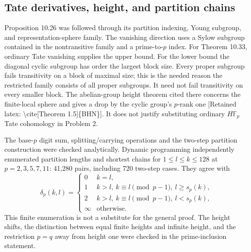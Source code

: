 \documentclass[10pt]{article}
\begin{document}
\subsection*{Tate derivatives, height, and partition chains}
Proposition 10.26 was followed through its partition indexing, Young subgroup, and representation-sphere family. The vanishing direction uses a Sylow subgroup contained in the nontransitive family and a prime-to-\(p\) index. For Theorem 10.33, ordinary Tate vanishing supplies the upper bound. For the lower bound the diagonal cyclic subgroup has order the largest block size. Every proper subgroup fails transitivity on a block of maximal size; this is the needed reason the restricted family consists of all proper subgroups. It need not fail transitivity on every smaller block. The abelian-group height theorem cited there concerns the finite-local sphere and gives a drop by the cyclic group’s \(p\)-rank one [Retained latex: \textbackslash{}cite[Theorem 1.5]\{BHN\}]. It does not justify substituting ordinary \(H\mathbb F_p\) Tate cohomology in Problem 2.\par
The base-\(p\) digit sum, splitting/carrying operations and the two-step partition construction were checked analytically. Dynamic programming independently enumerated partition lengths and shortest chains for \(1\le l\le k\le128\) at \(p=2,3,5,7,11\): 41,280 pairs, including 720 two-step cases. They agree with \[\delta_p(k,l)=
 \begin{cases}
 0 & k=l,\\
 1 & k>l,\ k\equiv l\pmod{p-1},\ l\ge s_p(k),\\
 2 & k>l,\ k\equiv l\pmod{p-1},\ l<s_p(k),\\
 \infty & \text{otherwise}.
 \end{cases}\] This finite enumeration is not a substitute for the general proof. The height shifts, the distinction between equal finite heights and infinite height, and the restriction \(p=q\) away from height one were checked in the prime-inclusion statement.\par
\end{document}
